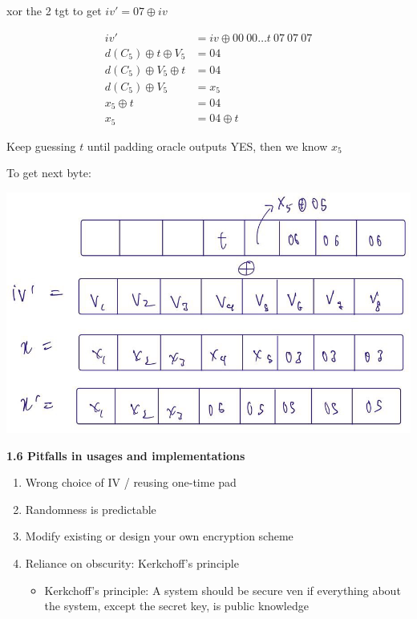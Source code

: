 \documentclass[landscape,a4paper]{extarticle}
\newenvironment{Figure}
  {\par\noindent\minipage{\linewidth}}
  {\endminipage\par\medskip}
\begin{document}
\begin{multicols*}{5}
    xor the 2 tgt to get $iv' = 07 \oplus iv$

    \begin{align*}
        iv' &= iv \oplus 00\ 00 \ldots t\ 07\ 07\ 07\\
        d(C_5) \oplus t \oplus V_5 &= 04\\
        d(C_5) \oplus V_5 \oplus t &= 04\\
        d(C_5) \oplus V_5 &= x_5\\
        x_5 \oplus t &= 04\\
        x_5 &= 04 \oplus t
    \end{align*}
    
    Keep guessing $t$ until padding oracle outputs YES, then we know $x_5$

    To get next byte:
    \begin{Figure}
        \centering
        \includegraphics[width=\linewidth]{padding_oracle_next_byte.jpg}
    \end{Figure} 

    \textbf{1.6 Pitfalls in usages and implementations}
    \begin{enumerate}
        \item Wrong choice of IV / reusing one-time pad
        \item Randomness is predictable
        \item Modify existing or design your own encryption scheme
        \item Reliance on obscurity: Kerkchoff's principle
        \begin{itemize}
            \item Kerkchoff's principle: A system should be secure ven if everything about the
            system, except the secret key, is public knowledge
        \end{itemize}
    \end{enumerate}


\end{multicols*}
\end{document}
